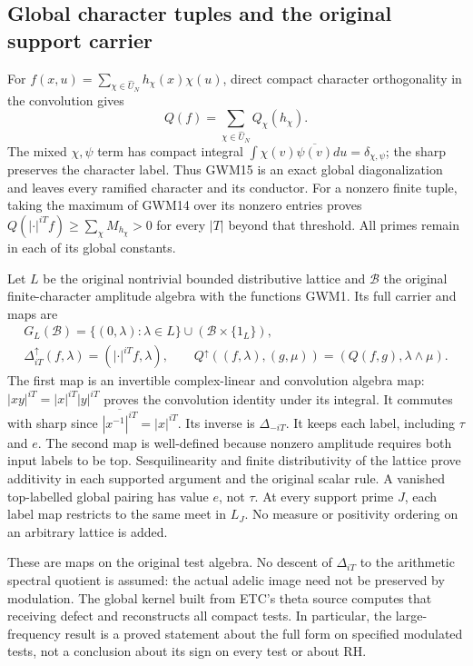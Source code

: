 \subsection{Global character tuples and the original support carrier}

For $f(x,u)=\sum_{\chi\in\widehat U_N}h_\chi(x)\chi(u)$, direct compact
character orthogonality in the convolution gives
\begin{equation}\tag{GWM15}
 Q(f)=\sum_{\chi\in\widehat U_N}Q_\chi(h_\chi).
\end{equation}
The mixed $\chi,\psi$ term has compact integral
$\int\chi(v)\overline{\psi(v)}du=\delta_{\chi,\psi}$; the sharp
preserves the character label. Thus GWM15 is an exact global
diagonalization and leaves every ramified character and its conductor.
For a nonzero finite tuple, taking the maximum of GWM14 over its
nonzero entries proves
$Q(|\cdot|^{iT}f)\ge\sum_\chi M_{h_\chi}>0$ for every $|T|$ beyond
that threshold. All primes remain in each of its global constants.

Let $L$ be the original nontrivial bounded distributive lattice and
$\mathcal B$ the original finite-character amplitude algebra with
the functions GWM1. Its full carrier and maps are
\begin{equation}\tag{GWM16}
 \begin{gathered}
 G_L(\mathcal B)=\{(0,\lambda):\lambda\in L\}
                      \cup(\mathcal B\times\{1_L\}),\\
 \Delta_{iT}^{\uparrow}(f,\lambda)=(|\cdot|^{iT}f,\lambda),\qquad
 Q^{\uparrow}((f,\lambda),(g,\mu))=(Q(f,g),\lambda\wedge\mu).
 \end{gathered}
\end{equation}
The first map is an invertible complex-linear and convolution
algebra map: $|xy|^{iT}=|x|^{iT}|y|^{iT}$ proves the convolution
identity under its integral. It commutes with sharp since
$\overline{|x^{-1}|^{iT}}=|x|^{iT}$. Its inverse is $\Delta_{-iT}$.
It keeps each label, including $\tau$ and $e$. The second map is
well-defined because nonzero amplitude requires both input labels
to be top. Sesquilinearity and finite distributivity of the lattice
prove additivity in each supported argument and the original scalar
rule. A vanished top-labelled global pairing has value $e$, not
$\tau$. At every support prime $J$, each label map restricts to
the same meet in $L_J$. No measure or positivity ordering on an
arbitrary lattice is added.

These are maps on the original test algebra. No descent of
$\Delta_{iT}$ to the arithmetic spectral quotient is assumed:
the actual adelic image need not be preserved by modulation.
The global kernel built from ETC's theta source computes that
receiving defect and reconstructs all compact tests. In particular,
the large-frequency result is a proved statement about the full
form on specified modulated tests, not a conclusion about its sign
on every test or about RH.

